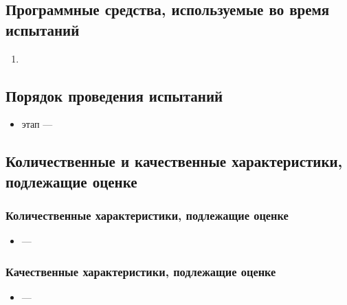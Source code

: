 \documentclass[allcolors=black]{article}
\begin{document}
    \subsection{Программные средства, используемые во время испытаний}
    \begin{enumerate}
        \item {}
    \end{enumerate}
    
    \subsection{Порядок проведения испытаний}
    \begin{itemize}
        \item {} этап --- 
    \end{itemize}

    \subsubsection{}


    \subsection{Количественные и качественные характеристики, подлежащие оценке}
    \subsubsection{Количественные характеристики, подлежащие оценке}
    \begin{itemize}
        \item \textit{} --- 
    \end{itemize}

    \subsubsection{Качественные характеристики, подлежащие оценке}
    \begin{itemize}
        \item \textit{} --- 
    \end{itemize}
\end{document}
